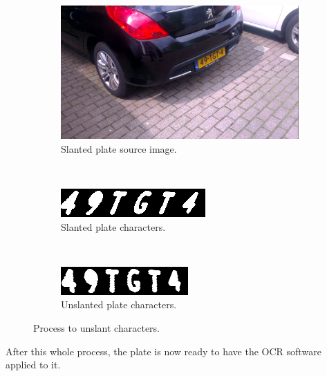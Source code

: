 \begin{figure}[ht]
        \centering
        \begin{subfigure}{0.33\textwidth}
            \includegraphics[width=\textwidth]{plaatjes/skewed-car}
            \caption{Slanted plate source image.}
            \label{fig:skewed-car}
        \end{subfigure}%
        ~ 
        \begin{subfigure}{0.33\textwidth}
            \includegraphics[width=\textwidth]{plaatjes/slanted-plate}
            \caption{Slanted plate characters.}
            \label{fig:slanted-plate}
        \end{subfigure}%
        ~ 
        \begin{subfigure}{0.33\textwidth}
            \includegraphics[width=\textwidth]{plaatjes/unslanted-plate}
            \caption{Unslanted plate characters.}
            \label{fig:unslanted-plate}
        \end{subfigure}%

        \caption{Process to unslant characters.}
        \label{fig:unslanting-plate}
\end{figure}

After this whole process, the plate is now ready to have the OCR software applied to it.

